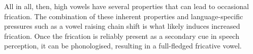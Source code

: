 \documentclass[output=paper,colorlinks,citecolor=brown,chinesefont]{langscibook}
\begin{document}
All in all, then, high vowels have several properties that can lead to occasional frication. The combination of these inherent properties and language-specific pressures such as a vowel raising chain shift is what likely induces increased frication. Once the frication is reliably present as a secondary cue in speech perception, it can be phonologised, resulting in a full-fledged fricative vowel.


\end{document}
